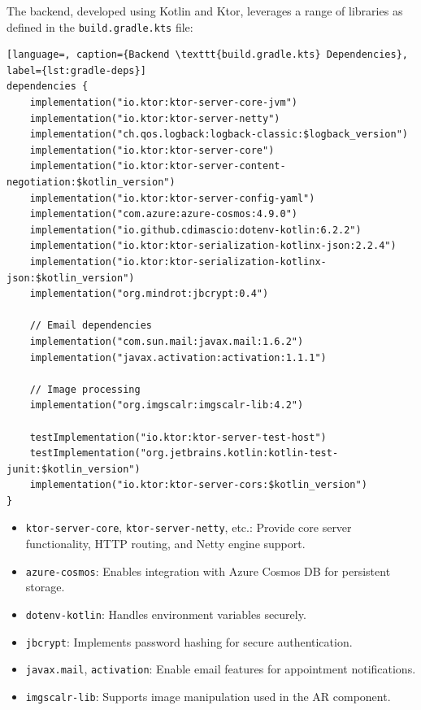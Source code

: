 \documentclass{article}
\begin{document}
The backend, developed using Kotlin and Ktor, leverages a range of libraries as defined in the \texttt{build.gradle.kts} file:

\begin{lstlisting}[language=, caption={Backend \texttt{build.gradle.kts} Dependencies}, label={lst:gradle-deps}]
dependencies {
    implementation("io.ktor:ktor-server-core-jvm")
    implementation("io.ktor:ktor-server-netty")
    implementation("ch.qos.logback:logback-classic:$logback_version")
    implementation("io.ktor:ktor-server-core")
    implementation("io.ktor:ktor-server-content-negotiation:$kotlin_version")
    implementation("io.ktor:ktor-server-config-yaml")
    implementation("com.azure:azure-cosmos:4.9.0")
    implementation("io.github.cdimascio:dotenv-kotlin:6.2.2")
    implementation("io.ktor:ktor-serialization-kotlinx-json:2.2.4")
    implementation("io.ktor:ktor-serialization-kotlinx-json:$kotlin_version")
    implementation("org.mindrot:jbcrypt:0.4")
    
    // Email dependencies
    implementation("com.sun.mail:javax.mail:1.6.2")
    implementation("javax.activation:activation:1.1.1")
    
    // Image processing
    implementation("org.imgscalr:imgscalr-lib:4.2")
    
    testImplementation("io.ktor:ktor-server-test-host")
    testImplementation("org.jetbrains.kotlin:kotlin-test-junit:$kotlin_version")
    implementation("io.ktor:ktor-server-cors:$kotlin_version")
}
\end{lstlisting}

\begin{itemize}
    \item \texttt{ktor-server-core}, \texttt{ktor-server-netty}, etc.: Provide core server functionality, HTTP routing, and Netty engine support.
    \item \texttt{azure-cosmos}: Enables integration with Azure Cosmos DB for persistent storage.
    \item \texttt{dotenv-kotlin}: Handles environment variables securely.
    \item \texttt{jbcrypt}: Implements password hashing for secure authentication.
    \item \texttt{javax.mail}, \texttt{activation}: Enable email features for appointment notifications.
    \item \texttt{imgscalr-lib}: Supports image manipulation used in the AR component.
\end{itemize}
\end{document}
